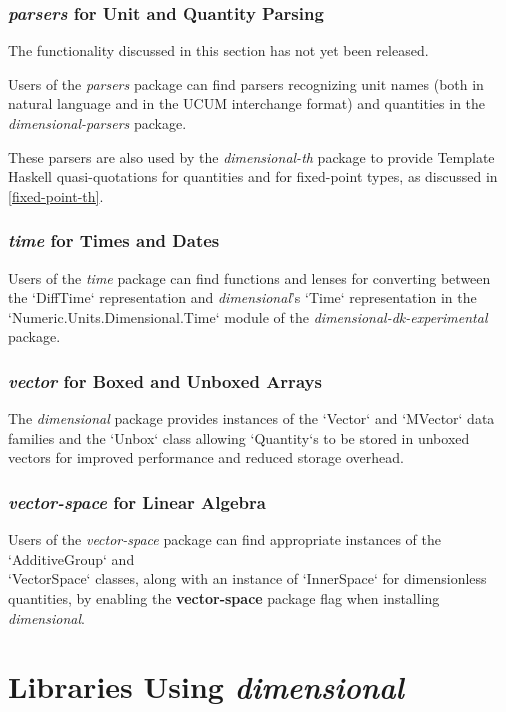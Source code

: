 \documentclass[11pt]{report}
\newcommand{\packagename}[1]{\textit{#1}}
\newcommand{\thispackage}{\packagename{dimensional}}
\newcommand{\experimentalpackage}{\packagename{dimensional-dk-experimental}}
\newcommand{\flag}[1]{\textbf{#1}}
\newcommand{\prerelease}{\begin{framed}
The functionality discussed in this section has not yet been released.
\end{framed}}
\begin{document}
\subsection{\packagename{parsers} for Unit and Quantity Parsing} \label{parsers-support}

\prerelease{}

Users of the \packagename{parsers} package can find parsers recognizing
unit names (both in natural language and in the UCUM interchange format) and
quantities in the \packagename{dimensional-parsers} package.

These parsers are also used by the \packagename{dimensional-th} package to provide
Template Haskell quasi-quotations for quantities and for fixed-point types, as
discussed in \ref{fixed-point-th}.

\subsection{\packagename{time} for Times and Dates}

Users of the \packagename{time} package can find functions and lenses for converting
between the `DiffTime` representation and \thispackage{}'s `Time` representation in the
`Numeric.Units.Dimensional.Time` module of the \experimentalpackage{} package.

\subsection{\packagename{vector} for Boxed and Unboxed Arrays}

The \thispackage{} package provides instances of the `Vector` and `MVector` data families and the `Unbox` class
allowing `Quantity`s to be stored in unboxed vectors for improved performance and reduced storage overhead.

\subsection{\packagename{vector-space} for Linear Algebra}

Users of the \packagename{vector-space} package can find appropriate instances of the `AdditiveGroup` and \\
`VectorSpace` classes, along with an instance of `InnerSpace` for dimensionless quantities, by enabling the \flag{vector-space}
package flag when installing \thispackage{}.

\chapter{Libraries Using \thispackage}
\end{document}
